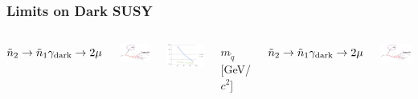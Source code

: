 \documentclass[compress]{beamer}
\newcommand{\s}[1]{{\mbox{\scriptsize #1}}}
\begin{document}
\begin{frame}
\frametitle{Limits on Dark SUSY}

\begin{columns}
\centering \mbox{$\tilde{n}_2 \to \tilde{n}_1 \gamma_\s{dark} \to 2\mu$}

\includegraphics[width=0.7\linewidth]{diagram_squark_2mu.png}

\includegraphics[width=\linewidth]{squarklimits_gamgam.png}

$m_{\tilde{q}}$ [GeV/$c^2$]

\centering \mbox{$\tilde{n}_2 \to \tilde{n}_1 \gamma_\s{dark} \to 2\mu$}

\includegraphics[width=0.7\linewidth]{diagram_squark_2mu.png}


\end{columns}
\end{frame}
\end{document}
